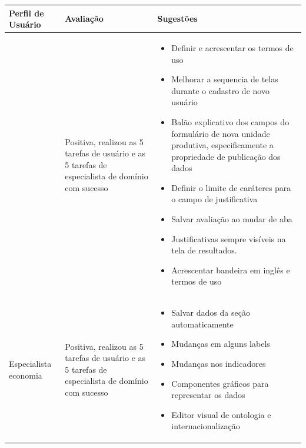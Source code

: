 \begin{table}
\begin{tabular}{|>{\centering}p{2.5cm}|>{\centering}p{2.5cm}|>{\centering}p{10cm}|}
\hline 
\textbf{\small{}Perfil de Usuário} & \textbf{\small{}Avaliação} & \textbf{\small{}Sugestões}\tabularnewline
\hline 
\hline 
{\small{}Especialista em sustentabilidade} & {\small{}Positiva, realizou as 5 tarefas de usuário e as 5 tarefas
de especialista de domínio com sucesso} & \begin{itemize}
\item {\small{}Definir e acrescentar os termos de uso}{\small \par}
\item {\small{}Melhorar a sequencia de telas durante o cadastro de novo
usuário}{\small \par}
\item {\small{}Balão explicativo dos campos do formulário de nova unidade
produtiva, especificamente a propriedade de publicação dos dados}{\small \par}
\item {\small{}Definir o limite de caráteres para o campo de justificativa}{\small \par}
\item {\small{}Salvar avaliação ao mudar de aba}{\small \par}
\item {\small{}Justificativas sempre visíveis na tela de resultados.}{\small \par}
\item {\small{}Acrescentar bandeira em inglês e termos de uso}
\end{itemize}
\tabularnewline
\hline 
{\small{}Especialista economia} & {\small{}Positiva, realizou as 5 tarefas de usuário e as 5 tarefas
de especialista de domínio com sucesso} & \begin{itemize}
\item {\small{}Salvar dados da seção automaticamente}{\small \par}
\item {\small{}Mudanças em alguns }\foreignlanguage{english}{{\small{}labels}}{\small \par}
\item {\small{}Mudanças nos indicadores}{\small \par}
\item {\small{}Componentes gráficos para representar os dados }{\small \par}
\item {\small{}Editor visual de ontologia e internacionalização}

\end{itemize}
\end{tabular}
\end{table}
